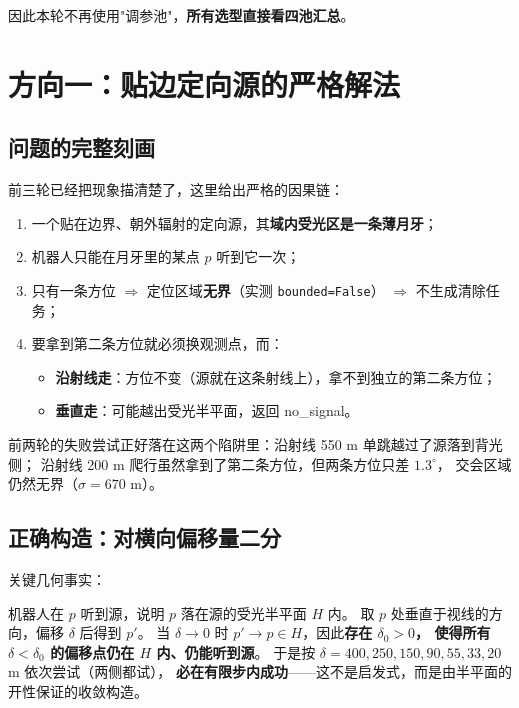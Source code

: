 因此本轮不再使用"调参池"，\textbf{所有选型直接看四池汇总}。

\section{方向一：贴边定向源的严格解法}

\subsection{问题的完整刻画}

前三轮已经把现象描清楚了，这里给出严格的因果链：

\begin{enumerate}[leftmargin=1.8em]
  \item 一个贴在边界、朝外辐射的定向源，其\textbf{域内受光区是一条薄月牙}；
  \item 机器人只能在月牙里的某点 $p$ 听到它一次；
  \item 只有一条方位 $\Rightarrow$ 定位区域\textbf{无界}（实测 \texttt{bounded=False}）
        $\Rightarrow$ 不生成清除任务；
  \item 要拿到第二条方位就必须换观测点，而：
        \begin{itemize}
          \item \textbf{沿射线走}：方位不变（源就在这条射线上），拿不到独立的第二条方位；
          \item \textbf{垂直走}：可能越出受光半平面，返回 no\_signal。
        \end{itemize}
\end{enumerate}

前两轮的失败尝试正好落在这两个陷阱里：沿射线 550 m 单跳越过了源落到背光侧；
沿射线 200 m 爬行虽然拿到了第二条方位，但两条方位只差 $1.3^{\circ}$，
交会区域仍然无界（$\sigma=670$ m）。

\subsection{正确构造：对横向偏移量二分}

关键几何事实：

\begin{keybox}[title=偏移二分必然收敛]
机器人在 $p$ 听到源，说明 $p$ 落在源的受光半平面 $H$ 内。
取 $p$ 处垂直于视线的方向，偏移 $\delta$ 后得到 $p'$。
当 $\delta\to 0$ 时 $p'\to p\in H$，因此\textbf{存在 $\delta_0>0$，
使得所有 $\delta<\delta_0$ 的偏移点仍在 $H$ 内、仍能听到源}。
于是按 $\delta=400,250,150,90,55,33,20$ m 依次尝试（两侧都试），
\textbf{必在有限步内成功}——这不是启发式，而是由半平面的开性保证的收敛构造。
\end{keybox}

